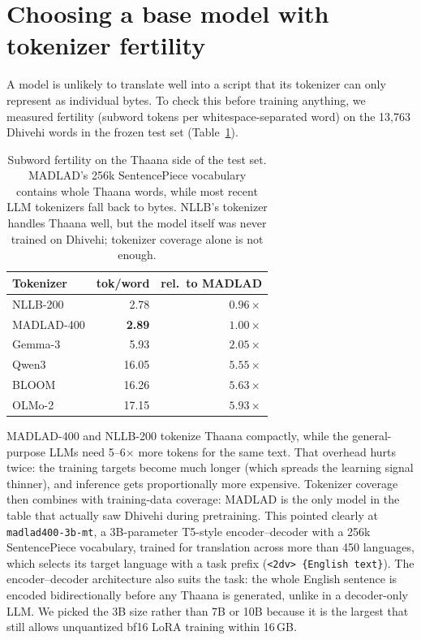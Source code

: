 \documentclass[10pt,twocolumn]{article}
\begin{document}
\section{Choosing a base model with tokenizer fertility}
\label{sec:model}

A model is unlikely to translate well into a script that its tokenizer can
only represent as individual bytes. To check this before training
anything, we measured fertility (subword tokens per whitespace-separated
word) on the 13{,}763 Dhivehi words in the frozen test set
(Table~\ref{tab:fertility}).

\begin{table}[t]
\centering\small
\begin{tabular}{lrr}
\toprule
Tokenizer & tok/word & rel.\ to MADLAD \\
\midrule
NLLB-200          & 2.78 & $0.96\times$ \\
MADLAD-400        & \textbf{2.89} & $1.00\times$ \\
Gemma-3           & 5.93 & $2.05\times$ \\
Qwen3             & 16.05 & $5.55\times$ \\
BLOOM             & 16.26 & $5.63\times$ \\
OLMo-2            & 17.15 & $5.93\times$ \\
\bottomrule
\end{tabular}
\caption{Subword fertility on the Thaana side of the test set. MADLAD's
256k SentencePiece vocabulary contains whole Thaana words, while most
recent LLM tokenizers fall back to bytes. NLLB's tokenizer handles Thaana
well, but the model itself was never trained on Dhivehi; tokenizer
coverage alone is not enough.}
\label{tab:fertility}
\end{table}

MADLAD-400 and NLLB-200 tokenize Thaana compactly, while the
general-purpose LLMs need 5--6$\times$ more tokens for the same text. That
overhead hurts twice: the training targets become much longer (which
spreads the learning signal thinner), and inference gets proportionally
more expensive. Tokenizer coverage then combines with training-data
coverage: MADLAD is the only model in the table that actually saw Dhivehi
during pretraining. This pointed clearly at \texttt{madlad400-3b-mt}, a
3B-parameter T5-style encoder--decoder with a 256k SentencePiece
vocabulary, trained for translation across more than 450 languages, which
selects its target language with a task prefix (\texttt{<2dv> \{English
text\}}). The encoder--decoder architecture also suits the task: the
whole English sentence is encoded bidirectionally before any Thaana is
generated, unlike in a decoder-only LLM. We picked the 3B size rather
than 7B or 10B because it is the largest that still allows unquantized
bf16 LoRA training within 16\,GB.
\end{document}

